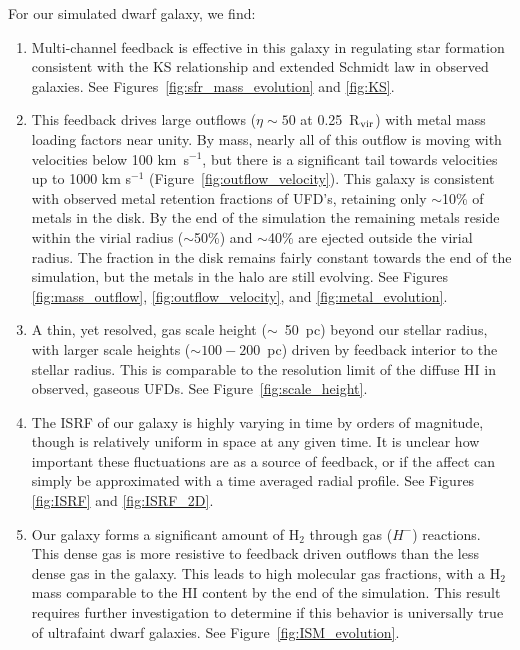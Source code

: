 \documentclass[twocolumn]{aastex61}
\begin{document}
For our simulated dwarf galaxy, we find:
\begin{enumerate}
\item Multi-channel feedback is effective in this galaxy in regulating star formation consistent with the KS relationship and extended Schmidt law in observed galaxies. See Figures~\ref{fig:sfr_mass_evolution} and \ref{fig:KS}.

\item This feedback drives large outflows ($\eta \sim 50$ at 0.25~R$_{\rm vir}$) with metal mass loading factors near unity. By mass, nearly all of this outflow is moving with velocities below 100 km~s$^{-1}$, but there is a significant tail towards velocities up to 1000 km s$^{-1}$ (Figure~\ref{fig:outflow_velocity}). This galaxy is consistent with observed metal retention fractions of UFD's, retaining only $\sim$10\% of metals in the disk. By the end of the simulation the remaining metals reside within the virial radius ($\sim$50\%) and $\sim$40\% are ejected outside the virial radius. The fraction in the disk remains fairly constant towards the end of the simulation, but the metals in the halo are still evolving. See Figures \ref{fig:mass_outflow}, \ref{fig:outflow_velocity}, and \ref{fig:metal_evolution}.

\item A thin, yet resolved, gas scale height ($\sim$~50~pc) beyond our stellar radius, with larger scale heights ($\sim 100 - 200$~pc) driven by feedback interior to the stellar radius. This is comparable to the resolution limit of the diffuse HI in observed, gaseous UFDs. See Figure~\ref{fig:scale_height}.

\item The ISRF of our galaxy is highly varying in time by orders of magnitude, though is relatively uniform in space at any given time. It is unclear how important these fluctuations are as a source of feedback, or if the affect can simply be approximated with a time averaged radial profile. See Figures \ref{fig:ISRF} and \ref{fig:ISRF_2D}.

\item Our galaxy forms a significant amount of H$_2$ through gas ($H^-$) reactions. This dense gas is more resistive to feedback driven outflows than the less dense gas in the galaxy. This leads to high molecular gas fractions, with a H$_2$ mass comparable to the HI content by the end of the simulation. This result requires further investigation to determine if this behavior is universally true of ultrafaint dwarf galaxies. See Figure~\ref{fig:ISM_evolution}.
\end{enumerate}
\end{document}

